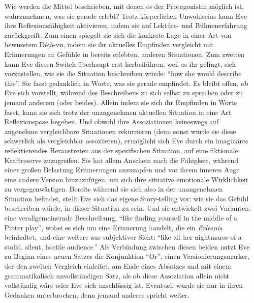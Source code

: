 \documentclass[fontsize=12pt]{scrartcl}
\begin{document}
Wie werden die Mittel beschrieben, mit denen es der Protagonistin\textsuperscript{\tiny *} m\"oglich ist, wahrzunehmen, was sie gerade erlebt? Trotz k\"orperlichen Unwohlseins kann Eve ihre Reflexionsf\"ahigkeit aktivieren, indem sie auf Lekt\"ure- und B\"uhnenerfah\-rung zur\"uckgreift. Zum einen spiegelt sie sich die konkrete Lage in einer Art von bewusstem D\'{e}j\`{a}-vu, indem sie ihr aktuelles Empfinden vergleicht mit Erinnerungen an Ge\-f\"uhle in bereits erlebten, anderen Situationen. Zum zwei\-ten kann Eve diesen Switch \"uberhaupt erst herbeif\"uhren, weil es ihr gelingt, sich vorzustellen, wie sie die Situation beschrei\-ben w\"urde: "`how she would describe this"'. Sie fasst gedanklich in Worte, was sie gerade empfindet. Es bleibt offen, ob Eve sich vorstellt, w\"ahrend des Beschrei\-bens zu sich \mbox{selbst} zu sprechen oder zu jemand anderem (oder beides). Allein indem sie sich ihr Empfinden in Worte fasst, kann sie sich trotz der unangenehmen aktuellen Situation in eine Art Reflexionspose begeben. Und obwohl ihre Assoziationen keineswegs auf angenehme vergleichbare Situationen rekurrieren (denn sonst w\"urde sie diese schwerlich als vergleichbar assoziieren), erm\"oglicht sich Eve durch ein imagin\"ares reflektierendes He\-raustreten aus der spezifischen Situation, auf eine fiktionale Kraftreserve zuzugreifen. Sie hat allem Anschein nach die F\"ahigkeit, w\"ahrend einer gro{\ss}en Belastung Erinnerungen anzuzapfen und vor ihrem inneren Auge eine andere Version hinzuzuf\"ugen, um sich ihre situative emotionale Wirklichkeit zu vergegenw\"artigen. Bereits w\"ahrend sie sich also in der unangenehmen Situation befindet, stellt Eve sich das eigene Story-telling vor: wie sie das Ge\-f\"uhl beschrei\-ben w\"urde, in dieser Situation zu sein. Und sie ent\-wickelt zwei Varianten: eine verallge\-mei\-nernde Beschreibung, "`like finding yourself in the middle of a Pinter play"', wobei es sich um eine Erinnerung handelt, die ein \textit{Erlesnis} beinhaltet, und eine weitere aus subjektiver Sicht: "`like all her nightmares of a stolid, silent, hostile audience."' Als Verbindung zwischen diesen beiden nutzt Eve zu Beginn eines neuen Satzes die Konjunktion "`Or"', einen Versionierungsmarker, der den zwei\-ten Vergleich einleitet, am Ende eines Absatzes und mit einem grammatikalisch unvollst\"andigen Satz, als ob diese Assoziation allein nicht vollst\"andig w\"are oder Eve sich unschl\"ussig ist. Eventuell wurde sie nur in ihren Gedanken unterbrochen, denn jemand anderes spricht weiter.
\end{document}
